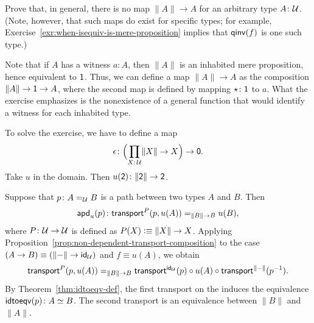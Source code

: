 \begin{exr}\ua
    Prove that, in general, there is no map\/ $\lVert A\rVert\to A$ for an arbitrary type\/ $A\colon\univ$. (Note, however, that such maps do exist for specific types; for example, {\upshape Exercise~\ref{exr:when-isequiv-is-mere-proposition}} implies that\/ $\mathsf{qinv}(f)$ is one such type.)
\end{exr}

\begin{solution}
    Note that if $A$ has a witness $a\colon A$, then $\lVert A\rVert$ is an inhabited mere proposition, hence equivalent to $\mathsf{1}$. Thus, we can define a map $\lVert A\rVert\to A$ as the composition $\lVert A\rVert\to\mathsf{1}\to A$, where the second map is defined by mapping $\star\colon\fun1$ to $a$. What the exercise emphasizes is the nonexistence of a general function that would identify a witness for each inhabited type.

    To solve the exercise, we have to define a map
    \[
        \epsilon\colon
            \Bigl(
                \prod_{X\colon\univ}\lVert X\rVert\to X
            \Bigr)
            \to\fun0.
    \]
    Take $u$ in the domain. Then $u(\fun2)\colon\lVert\fun2\rVert\to\fun2$.

    Suppose that $p\colon A\eq\univ B$ is a path between two types $A$ and $B$. Then
    \[
        \fun{apd}_u(p)\colon
            \fun{transport}^P(p,u(A))\eq{\lVert B\rVert\to B}u(B),
    \]
    where $P\colon\univ\to\univ$ is defined as $P(X)\mathrel{\vcentcolon}\equiv\lVert X\rVert\to X$. Applying Proposition~\ref{prop:non-dependent-transport-composition} to the case $(A\to B)\equiv(\lVert-\rVert\to\mathsf{id}_\mathcal U)$ and $f\equiv u(A)$, we obtain
    \[
        \mathsf{transport}^P(p,u(A))
        \mathrel{=_{\lVert B\rVert\to B}}
        \mathsf{transport}^{\mathsf{id}_\mathcal U}(p)
            \circ u(A)
            \circ\mathsf{transport}^{\lVert-\rVert}(p^{-1}).
    \]
    By Theorem~\ref{thm:idtoeqv-def}, the first transport on the \rhs induces the equivalence $\fun{idtoeqv}(p)\colon A\simeq B$. The second transport is an equivalence between $\lVert B\rVert$ and~$\lVert A\rVert$.


\end{solution}
